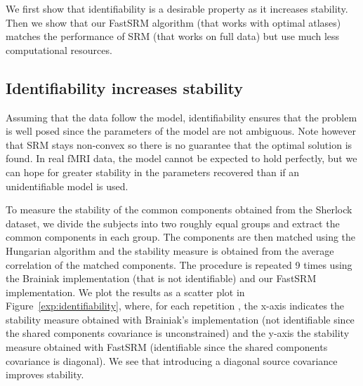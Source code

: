 \documentclass{article}
\newcommand{\bt}[1]{\todo[color=orange, inline=True]{BT: #1}}
\begin{document}
We first show that identifiability is a desirable property as it increases
stability.
%
Then we show that our FastSRM algorithm (that works with optimal atlases)
matches the performance of SRM (that works on full data) but use much less
computational resources.
%


\subsection{Identifiability increases stability}
Assuming that the data follow the model, identifiability ensures that the
problem is well posed since the parameters of the model are not ambiguous. Note however that SRM
stays non-convex so there is no guarantee that the optimal solution is found.
%
%
In real fMRI data, the model cannot be expected to hold perfectly, but we can
hope for greater stability in the parameters recovered than if an unidentifiable
model is used.
%


To measure the stability of the common components obtained from the Sherlock
dataset, we divide the subjects into two roughly equal groups and extract the
common components in each group.
%
The components are then matched using the Hungarian algorithm and the stability
measure is obtained from the average correlation of the matched components.
%
The procedure is repeated 9 times using the Brainiak implementation (that is not
identifiable) and our
FastSRM implementation.
%
We plot the results as a scatter plot in Figure~\ref{exp:identifiability}, where, for each repetition , the x-axis indicates the stability measure obtained with Brainiak's implementation
(not identifiable since the shared components covariance is unconstrained) and the y-axis the stability measure
obtained with FastSRM (identifiable since the shared components covariance is diagonal).
%
We see that introducing a diagonal source covariance improves stability.
%
\end{document}

